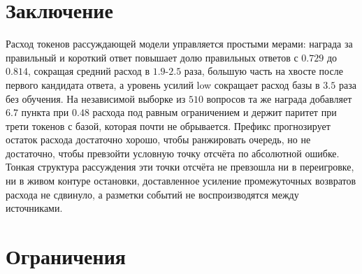 \documentclass[11pt]{article}
\begin{document}
\section{Заключение}

Расход токенов рассуждающей модели управляется простыми мерами: награда за правильный и короткий ответ повышает долю правильных ответов с $0.729$ до $0.814$, сокращая средний расход в $1.9$-$2.5$ раза, большую часть на хвосте после первого кандидата ответа, а уровень усилий low сокращает расход базы в $3.5$ раза без обучения. На независимой выборке из $510$ вопросов та же награда добавляет $6.7$ пункта при $0.48$ расхода под равным ограничением и держит паритет при трети токенов с базой, которая почти не обрывается. Префикс прогнозирует остаток расхода достаточно хорошо, чтобы ранжировать очередь, но не достаточно, чтобы превзойти условную точку отсчёта по абсолютной ошибке. Тонкая структура рассуждения эти точки отсчёта не превзошла ни в переигровке, ни в живом контуре остановки, доставленное усиление промежуточных возвратов расхода не сдвинуло, а разметки событий не воспроизводятся между источниками.

\section*{Ограничения}
\end{document}
